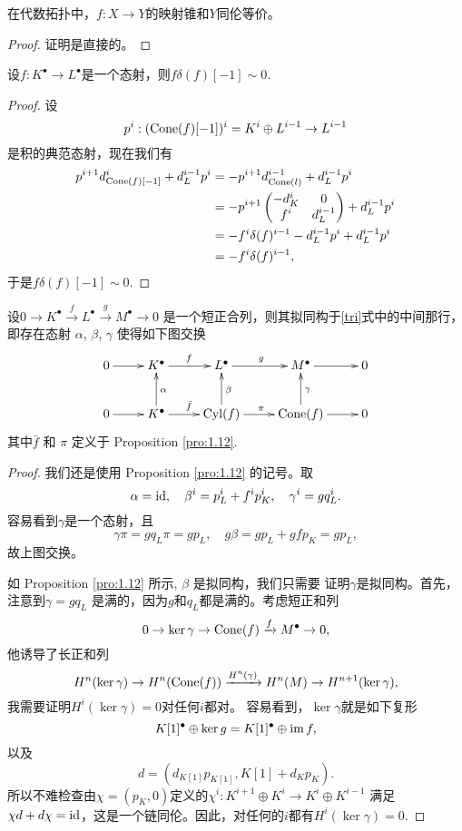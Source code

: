 在代数拓扑中，$f:X\to Y$的映射锥和$Y$同伦等价。

\begin{proof}
	证明是直接的。
\end{proof}

\begin{lem}\label{lem:1.13}
	设$f:K^\bullet\to L^\bullet$是一个态射，则$f\delta(f)[-1]\sim 0$.
\end{lem}

\begin{proof}
	设
	\[
		p^i:(\operatorname{Cone}(f)[-1])^i=K^i\oplus L^{i-1}\to L^{i-1}
	\]
	是积的典范态射，现在我们有
	\[
		\begin{aligned}
			p^{i+1}d^i_{\operatorname{Cone}(f)[-1]}+d^{i-1}_{L}p^i
			&=-p^{i+1}d^{i-1}_{\operatorname{Cone}(l)}+d^{i-1}_{L}p^i\\
			&=-p^{i+1}\begin{pmatrix}
				-d^{i}_{K}&0\\
				f^i&d_{L}^{i-1}
			\end{pmatrix}+d^{i-1}_{L}p^i\\
			&=-f^i\delta(f)^{i-1}-d_{L}^{i-1}p^i+d^{i-1}_{L}p^i\\
			&=-f^i\delta(f)^{i-1},
		\end{aligned}
	\]
	于是$f\delta(f)[-1] \sim 0$.
\end{proof}

\begin{pro}\label{pro:1.13}
	设$0\to K^\bullet \xrightarrow{f}L^\bullet \xrightarrow{g}M^\bullet\to 0$
    是一个短正合列，则其拟同构于\eqref{tri}式中的中间那行，即存在态射
    $\alpha$, $\beta$, $\gamma$ 使得如下图交换
	\[
		\xymatrix{
		0 \ar@{->}[r] & K^\bullet \ar@{->}[r]^{f} & L^\bullet \ar@{->}[r]^{g} & M^\bullet \ar@{->}[r] & 0 \\
		0 \ar@{->}[r] & K^\bullet \ar@{->}[r]^{\bar f} \ar@{->}[u]_{\alpha} & \operatorname{Cyl}(f) \ar@{->}[r]^{\pi} \ar@{->}[u]_{\beta} & \operatorname{Cone}(f) \ar@{->}[r] \ar@{->}[u]_{\gamma} & 0
		}
	\]
	其中$\bar f$ 和 $\pi$ 定义于 Proposition \ref{pro:1.12}.
\end{pro}

\begin{proof}
	我们还是使用 Proposition \ref{pro:1.12} 的记号。取
	\[
		\alpha=\operatorname{id},\quad \beta^i= p^i_{L} + f^i p^i_K,\quad \gamma^i=gq_L^i.
	\]
	容易看到$\gamma$是一个态射，且 
	\[
		\gamma\pi=gq_L\pi=gp_L,\quad g\beta=gp_L+gfp_K=gp_L,
	\]
	故上图交换。

	如 Proposition \ref{pro:1.12} 所示, $\beta$ 是拟同构，我们只需要
    证明$\gamma$是拟同构。首先，注意到$\gamma=gq_L$
    是满的，因为$g$和$q_L$都是满的。考虑短正和列
	\[
		0\to \ker \gamma\to \operatorname{Cone}(f)\xrightarrow{f} M^\bullet\to 0,
	\]
	他诱导了长正和列
	\[
		H^n(\ker \gamma)\to H^n(\operatorname{Cone}(f))\xrightarrow{H^n(\gamma)}H^n(M)\to H^{n+1}(\ker \gamma),
	\]
	我需要证明$H^i(\ker \gamma)=0$对任何$i$都对。
    容易看到，$\ker \gamma$就是如下复形
	\[
		K[1]^\bullet \oplus \ker g=K[1]^\bullet \oplus \operatorname{im} f,
	\]
	以及
	\[
		d=(d_{K[1]}p_{K[1]},K[1]+d_{K}p_K).
	\]
	所以不难检查由$\chi=(p_K,0)$定义的$\chi^i:K^{i+1}\oplus K^i\to K^i\oplus K^{i-1}$
    满足$\chi d+d \chi =\operatorname{id}$，这是一个链同伦。因此，对任何的$i$都有$H^i(\ker \gamma)=0$.
\end{proof}

